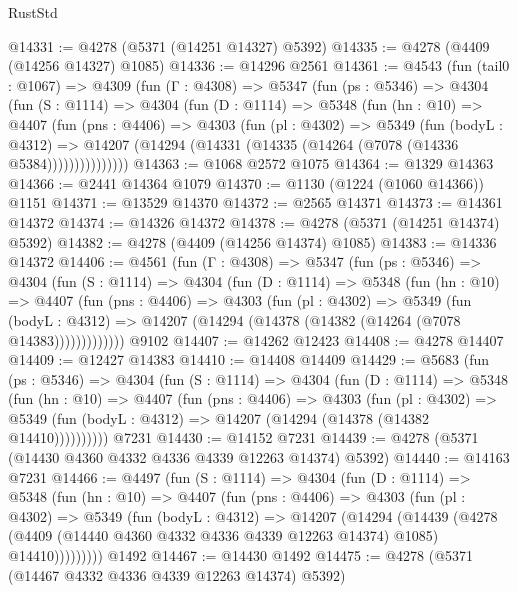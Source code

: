 \begin{lexlean}{RustStd}
\begin{coremodule}
@14331 := @4278 (@5371 (@14251 @14327) @5392)
@14335 := @4278 (@4409 (@14256 @14327) @1085)
@14336 := @14296 @2561
@14361 := @4543
    (fun (tail0 : @1067) =>
    @4309
      (fun (Γ : @4308) =>
      @5347
        (fun (ps : @5346) =>
        @4304
          (fun (S : @1114) =>
          @4304
            (fun (D : @1114) =>
            @5348
              (fun (hn : @10) =>
              @4407
                (fun (pns : @4406) =>
                @4303
                  (fun (pl : @4302) =>
                  @5349
                    (fun (bodyL : @4312) =>
                    @14207 (@14294 (@14331 (@14335 (@14264 (@7078 (@14336 @5384)))))))))))))))
@14363 := @1068 @2572 @1075
@14364 := @1329 @14363
@14366 := @2441 @14364 @1079
@14370 := @1130 (@1224 (@1060 @14366)) @1151
@14371 := @13529 @14370
@14372 := @2565 @14371
@14373 := @14361 @14372
@14374 := @14326 @14372
@14378 := @4278 (@5371 (@14251 @14374) @5392)
@14382 := @4278 (@4409 (@14256 @14374) @1085)
@14383 := @14336 @14372
@14406 := @4561
    (fun (Γ : @4308) =>
    @5347
      (fun (ps : @5346) =>
      @4304
        (fun (S : @1114) =>
        @4304
          (fun (D : @1114) =>
          @5348
            (fun (hn : @10) =>
            @4407
              (fun (pns : @4406) =>
              @4303
                (fun (pl : @4302) =>
                @5349
                  (fun (bodyL : @4312) =>
                  @14207 (@14294 (@14378 (@14382 (@14264 (@7078 @14383)))))))))))))
    @9102
@14407 := @14262 @12423
@14408 := @4278 @14407
@14409 := @12427 @14383
@14410 := @14408 @14409
@14429 := @5683
    (fun (ps : @5346) =>
    @4304
      (fun (S : @1114) =>
      @4304
        (fun (D : @1114) =>
        @5348
          (fun (hn : @10) =>
          @4407
            (fun (pns : @4406) =>
            @4303
              (fun (pl : @4302) =>
              @5349 (fun (bodyL : @4312) => @14207 (@14294 (@14378 (@14382 @14410))))))))))
    @7231
@14430 := @14152 @7231
@14439 := @4278 (@5371 (@14430 @4360 @4332 @4336 @4339 @12263 @14374) @5392)
@14440 := @14163 @7231
@14466 := @4497
    (fun (S : @1114) =>
    @4304
      (fun (D : @1114) =>
      @5348
        (fun (hn : @10) =>
        @4407
          (fun (pns : @4406) =>
          @4303
            (fun (pl : @4302) =>
            @5349
              (fun (bodyL : @4312) =>
              @14207
                (@14294
                  (@14439
                    (@4278
                      (@4409 (@14440 @4360 @4332 @4336 @4339 @12263 @14374) @1085)
                      @14410)))))))))
    @1492
@14467 := @14430 @1492
@14475 := @4278 (@5371 (@14467 @4332 @4336 @4339 @12263 @14374) @5392)

\end{coremodule}
\end{lexlean}

